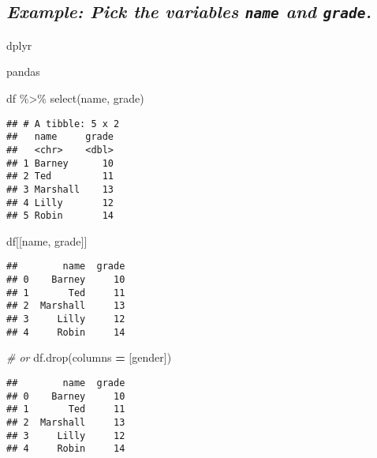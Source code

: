 \documentclass[
]{book}
\newenvironment{Shaded}{\begin{snugshade}}{\end{snugshade}}
\newcommand{\CommentTok}[1]{\textcolor[rgb]{0.56,0.35,0.01}{\textit{#1}}}
\newcommand{\FunctionTok}[1]{\textcolor[rgb]{0.00,0.00,0.00}{#1}}
\newcommand{\NormalTok}[1]{#1}
\newcommand{\OperatorTok}[1]{\textcolor[rgb]{0.81,0.36,0.00}{\textbf{#1}}}
\newcommand{\SpecialCharTok}[1]{\textcolor[rgb]{0.00,0.00,0.00}{#1}}
\newcommand{\StringTok}[1]{\textcolor[rgb]{0.31,0.60,0.02}{#1}}
\begin{document}
\hypertarget{example-pick-the-variables-name-and-grade.}{%
\subsection{\texorpdfstring{\emph{Example: Pick the variables \texttt{name} and \texttt{grade}.}}{Example: Pick the variables name and grade.}}\label{example-pick-the-variables-name-and-grade.}}

dplyr

pandas

\begin{Shaded}
\begin{Highlighting}[]
\NormalTok{df }\SpecialCharTok{\%\textgreater{}\%} 
  \FunctionTok{select}\NormalTok{(name, grade)}
\end{Highlighting}
\end{Shaded}

\begin{verbatim}
## # A tibble: 5 x 2
##   name     grade
##   <chr>    <dbl>
## 1 Barney      10
## 2 Ted         11
## 3 Marshall    13
## 4 Lilly       12
## 5 Robin       14
\end{verbatim}

\begin{Shaded}
\begin{Highlighting}[]
\NormalTok{df[[}\StringTok{\textquotesingle{}name\textquotesingle{}}\NormalTok{, }\StringTok{\textquotesingle{}grade\textquotesingle{}}\NormalTok{]]}
\end{Highlighting}
\end{Shaded}

\begin{verbatim}
##        name  grade
## 0    Barney     10
## 1       Ted     11
## 2  Marshall     13
## 3     Lilly     12
## 4     Robin     14
\end{verbatim}

\begin{Shaded}
\begin{Highlighting}[]
\CommentTok{\# or}
\NormalTok{df.drop(columns }\OperatorTok{=}\NormalTok{ [}\StringTok{\textquotesingle{}gender\textquotesingle{}}\NormalTok{])}
\end{Highlighting}
\end{Shaded}

\begin{verbatim}
##        name  grade
## 0    Barney     10
## 1       Ted     11
## 2  Marshall     13
## 3     Lilly     12
## 4     Robin     14
\end{verbatim}
\end{document}
